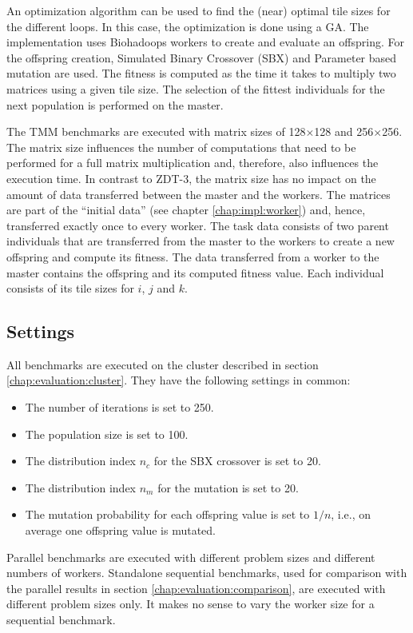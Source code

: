 An optimization algorithm can be used to find the (near) optimal tile sizes for the different loops. In this case, the optimization is done using a GA. The implementation uses Biohadoops workers to create and evaluate an offspring. For the offspring creation, Simulated Binary Crossover (SBX) and Parameter based mutation are used. The fitness is computed as the time it takes to multiply two matrices using a given tile size. The selection of the fittest individuals for the next population is performed on the master.

The TMM benchmarks are executed with matrix sizes of 128$\times$128 and 256$\times$256. The matrix size influences the number of computations that need to be performed for a full matrix multiplication and, therefore, also influences the execution time. In contrast to ZDT-3, the matrix size has no impact on the amount of data transferred between the master and the workers. The matrices are part of the ``initial data'' (see chapter \ref{chap:impl:worker}) and, hence, transferred exactly once to every worker. The task data consists of two parent individuals that are transferred from the master to the workers to create a new offspring and compute its fitness. The data transferred from a worker to the master contains the offspring and its computed fitness value. Each individual consists of its tile sizes for $i$, $j$ and $k$.

\subsection{Settings}
All benchmarks are executed on the cluster described in section \ref{chap:evaluation:cluster}. They have the following settings in common:
\begin{itemize}
  \item The number of iterations is set to 250.
  \item The population size is set to 100.
  \item The distribution index $n_c$ for the SBX crossover is set to 20.
  \item The distribution index $n_m$ for the mutation is set to 20.
  \item The mutation probability for each offspring value is set to $1/n$, i.e., on average one offspring value is mutated.
\end{itemize}

Parallel benchmarks are executed with different problem sizes and different numbers of workers. Standalone sequential benchmarks, used for comparison with the parallel results in section \ref{chap:evaluation:comparison}, are executed with different problem sizes only. It makes no sense to vary the worker size for a sequential benchmark.

